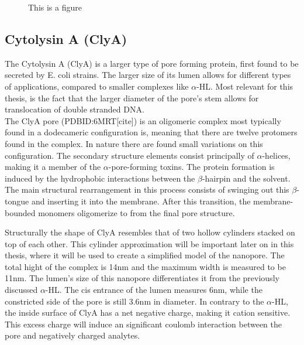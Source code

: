 \begin{figure}[ht]
\begin{centering}
  \caption{This is a figure}
  \label{fig:test}
  \end{centering}
\end{figure}



\subsection{Cytolysin A (ClyA)}

The Cytolysin A (ClyA) is a larger type of pore forming protein, first found to be
secreted by E. coli strains. The larger size of its lumen allows for different types of
applications, compared to smaller complexes like $\alpha$-HL. Most relevant for this
thesis, is the fact that the larger diameter of the pore's stem allows for translocation
of double stranded DNA.\\

The ClyA pore (PDBID:6MRT[cite]) is an oligomeric complex most typically found in a
 dodecameric configuration is, meaning that there are twelve protomers found in the
complex. In nature there are found small variations on this configuration. The secondary
structure elements consist principally of $\alpha$-helices, making it a member of the $
\alpha$-pore-forming toxins. The protein formation is induced by the hydrophobic
interactions between the $\beta$-hairpin and the solvent. The main structural
rearrangement in this process consists of swinging
out this $\beta$-tongue and inserting it into the membrane. After this transition, the
membrane-bounded monomers oligomerize to from the final pore structure.

Structurally the shape of ClyA resembles that of two hollow cylinders stacked on top of
each other. This cylinder approximation will be important later on in this thesis, where
it will be used to create a simplified model of the nanopore. The total hight of the
complex is
14nm and the maximum width is measured to be 11nm. The lumen's size of this nanopore
differentiates it from the previously discussed $\alpha$-HL. The cis entrance of the
lumen measures 6nm, while the constricted side of the pore is still 3.6nm in diameter. In
contrary to the $\alpha$-HL, the inside surface of ClyA has a net negative charge,
making it cation sensitive. This excess charge will induce an significant
 coulomb interaction between the pore and negatively charged analytes.

